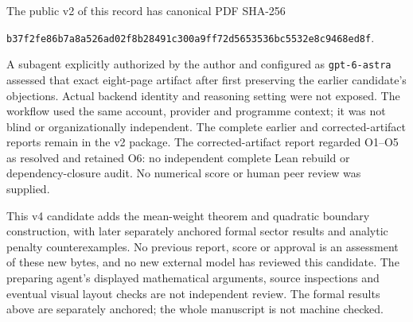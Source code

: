 \documentclass[11pt]{article}
\begin{document}
The public v2 of this record has canonical PDF SHA-256
\begin{center}\small\texttt{b37f2fe86b7a8a526ad02f8b28491c300a9ff72d5653536bc5532e8c9468ed8f}.\end{center}
A subagent explicitly authorized by the author and configured as
\texttt{gpt-6-astra} assessed that exact eight-page artifact after first
preserving the earlier candidate's objections. Actual backend identity and
reasoning setting were not exposed. The workflow used the same account,
provider and programme context; it was not blind or organizationally
independent. The complete earlier and corrected-artifact reports remain in
the v2 package. The corrected-artifact report regarded O1--O5 as resolved
and retained O6: no independent complete Lean rebuild or dependency-closure
audit. No numerical score or human peer review was supplied.

This v4 candidate adds the mean-weight theorem and quadratic boundary construction, with later separately anchored formal sector results and analytic penalty counterexamples. No previous report, score or approval is an assessment of these new
bytes, and no new external model has reviewed this candidate. The preparing
agent's displayed mathematical arguments, source inspections and eventual
visual layout checks are not independent review. The formal results above
are separately anchored; the whole manuscript is not machine checked.
\end{document}
